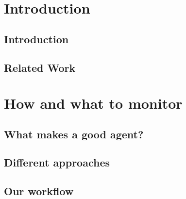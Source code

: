\documentclass
[
    twoside,                 %
    openright,               %
    cleardoublepage = empty, %
    fontsize = 12 pt,        %
    british,                 %
    captions = tableheading, %
    numbers = noenddot,      %
    footheight = 35 pt,      %
]
{scrbook}
\begin{document}
\frontmatter


\pagestyle{plain}







\tableofcontents

\pagestyle{headings}
\mainmatter


\part{Introduction}

\chapter{Introduction}


\chapter{Related Work}


\part{How and what to monitor}

\chapter{What makes a good agent?}


\chapter{Different approaches}


\chapter{Our workflow}

\end{document}
